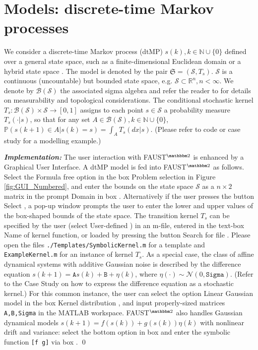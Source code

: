 \documentclass{llncs}
\newcommand*\circled[1]{\tikz[baseline=(char.base)]{\node[shape=circle,draw,inner sep=0.5pt] (char) {#1};}}
\newcommand{\software}{\textsf{FAUST}$^{\mathbbm 2}$\xspace}
\newcommand{\boxname}[1]{\textsf{#1}}
\begin{document}
\section{Models: discrete-time Markov processes}
\label{dtMPsys}
We consider a discrete-time Markov process (dtMP) $s(k), k \in \mathbb N \cup \{0\}$  
defined over a general state space, 
such as a finite-dimensional Euclidean domain \cite{MTH1993} or a hybrid state space \cite{APLS08}. 
The model is denoted by the pair $\mathfrak S = \left(\mathcal S, T_s\right)$. 
$\mathcal S$ is a continuous (uncountable) but bounded state space, e.g. $\mathcal S \subset \mathbb R^n, n < \infty$.
We denote by $\mathcal B (\mathcal S)$ the associated sigma algebra and refer the reader to \cite{APLS08,BS96} for details on measurability and topological considerations.
The conditional stochastic kernel $T_s:\mathcal B(\mathcal S)\times \mathcal S\rightarrow[0,1]$ 
assigns to each point $s \in \mathcal S$ a probability measure $T_s(\cdot | s)$, 
so that for any set $A \in \mathcal B(\mathcal S), k \in \mathbb N \cup \{0\}$,
$\mathbb P(s(k+1) \in A | s(k)=s) = \int_A T_s (dx|s)$.
(Please refer to code or case study for a modelling example.)  

\textit{\textbf{Implementation: }}
The user interaction with \software is enhanced by a Graphical User Interface. 
A dtMP model is fed into \software as follows. 
Select the \boxname{Formula free} option in the box \boxname{Problem selection} \circled{1} in Figure \ref{fig:GUI_Numbered}, 
and enter the bounds on the state space $\mathcal S$ as a $n\times 2$ matrix in the prompt \boxname{Domain} in box \circled{8}. 
Alternatively if the user presses the button \boxname{Select} \circled{8}, a pop-up window prompts the user to enter the lower and upper values of the box-shaped bounds of the state space. 
The transition kernel $T_s$ can be specified by the user (select \boxname{User-defined} \circled{2}) in an m-file, 
entered in the text-box \boxname{Name of kernel function},  
or loaded by pressing the button \boxname{Search for file} \circled{7}. 
Please open the files \texttt{./Templates/SymbolicKernel.m} for a template and \texttt{ExampleKernel.m} for an instance of kernel $T_s$. 
As a special case, 
the class of affine dynamical systems with additive Gaussian noise is described by the difference equation
$s(k+1) = \mathtt{A} s(k)+\mathtt{B}+\eta(k)$, where $\eta(\cdot)\sim\mathcal N(0,\mathtt{Sigma})$. 
(Refer to the Case Study on how to express the difference equation as a stochastic kernel.) 
For this common instance, 
the user can select the option \boxname{Linear Gaussian model} in the box \boxname{Kernel distribution} \circled{2}, 
and input properly-sized matrices \texttt{A,B,Sigma} in the MATLAB workspace.
\software also handles Gaussian dynamical models $s(k+1) = f(s(k))+g(s(k))\eta(k)$ with nonlinear drift and variance:
select the bottom option in box \circled{2} and enter the symbolic function \texttt{[f g]} via box \circled{7}.
\qed
\end{document}
